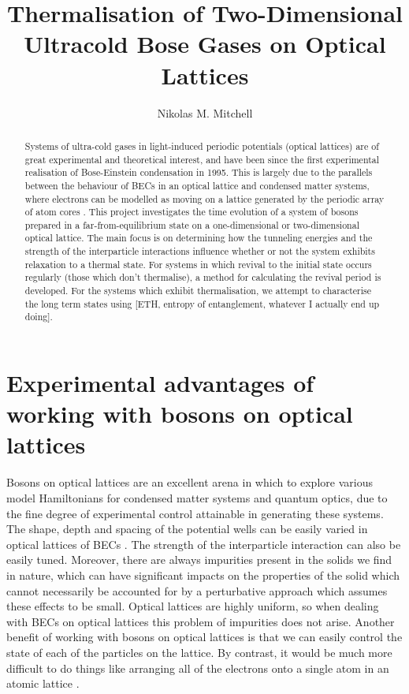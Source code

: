 \documentclass[a4paper,10pt]{article}
\title{Thermalisation of Two-Dimensional Ultracold Bose Gases on Optical Lattices}
\author{Nikolas M. Mitchell}
\begin{document}
\maketitle

\begin{abstract}

Systems of ultra-cold gases in light-induced periodic potentials (optical lattices) are of great experimental and theoretical interest, and have been since the first experimental 
realisation of Bose-Einstein condensation in 1995. 
This is largely due to the parallels between the behaviour of BECs in an optical lattice and condensed matter systems, where 
electrons can be modelled as moving on a lattice generated by the periodic array of atom cores \cite{Bloch2012}. This project 
investigates the time evolution of a system of bosons prepared in a far-from-equilibrium state on a one-dimensional or two-dimensional
optical lattice. The main focus is on determining how the tunneling energies and the strength of the interparticle interactions influence
whether or not the system exhibits relaxation to a thermal state. For systems in which revival to the initial state occurs regularly (those which don't thermalise), 
a method for calculating the revival period is developed. For the systems which exhibit thermalisation, we attempt to characterise the long term
states using [ETH, entropy of entanglement, whatever I actually end up doing].



\end{abstract}
\newpage
\section{Experimental advantages of working with bosons on optical lattices}
Bosons on optical lattices are an excellent arena in which to explore various model Hamiltonians for condensed matter systems and quantum optics, due to the 
fine degree of experimental control attainable in generating these systems.
The shape, depth and spacing of the potential wells can be easily varied in optical lattices of BECs \cite{Morsch2006}. 
The strength of the interparticle interaction can also be easily tuned. 
Moreover, there are always impurities present in the solids we find in nature,
which can have significant impacts on the properties of the solid which cannot necessarily be accounted for by a perturbative approach which assumes these effects 
to be small. Optical lattices are highly uniform, so when dealing with BECs on optical lattices this problem of impurities does not arise.
Another benefit of working with bosons on optical lattices is that we can easily control the state of each of the particles on the lattice. By contrast, it would be much more difficult to do things like
arranging all of the electrons onto a single atom in an atomic lattice .
\end{document}
